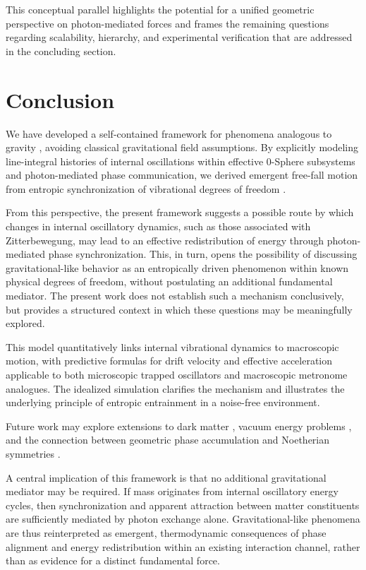 \documentclass[
 reprint,
 amsmath,amssymb,
 aps,
 prb,
]{revtex4-2}
\numberwithin{equation}{section}
\begin{document}
This conceptual parallel highlights the potential for a unified geometric perspective on photon-mediated forces and frames the remaining questions regarding scalability, hierarchy, and experimental verification that are addressed in the concluding section.

\section{Conclusion}
\label{sec:conclusion}

We have developed a self-contained framework for phenomena analogous to gravity \cite{Hanamura2026Trilogy3,Hanamura2025Trilogy1,Hanamura2026Trilogy2}, avoiding classical gravitational field assumptions. By explicitly modeling line-integral histories of internal oscillations within effective 0-Sphere subsystems and photon-mediated phase communication, we derived emergent free-fall motion from entropic synchronization of vibrational degrees of freedom \cite{Pikovsky2001,Strogatz2000,Bennett2002,Jacobson1995,Verlinde2011,Padmanabhan2010}.

From this perspective, the present framework suggests a possible route by which changes in internal oscillatory dynamics, such as those associated with Zitterbewegung, may lead to an effective redistribution of energy through photon-mediated phase synchronization. This, in turn, opens the possibility of discussing gravitational-like behavior as an entropically driven phenomenon within known physical degrees of freedom, without postulating an additional fundamental mediator. The present work does not establish such a mechanism conclusively, but provides a structured context in which these questions may be meaningfully explored.

This model quantitatively links internal vibrational dynamics to macroscopic motion, with predictive formulas for drift velocity and effective acceleration applicable to both microscopic trapped oscillators and macroscopic metronome analogues. The idealized simulation clarifies the mechanism and illustrates the underlying principle of entropic entrainment in a noise-free environment.

Future work may explore extensions to dark matter \cite{Hanamura2025Spin}, vacuum energy problems \cite{Hanamura2026Vacuum}, and the connection between geometric phase accumulation and Noetherian symmetries \cite{Hanamura2025Noetherian}.

A central implication of this framework is that no additional gravitational mediator may be required. If mass originates from internal oscillatory energy cycles, then synchronization and apparent attraction between matter constituents are sufficiently mediated by photon exchange alone. Gravitational-like phenomena are thus reinterpreted as emergent, thermodynamic consequences of phase alignment and energy redistribution within an existing interaction channel, rather than as evidence for a distinct fundamental force.
\end{document}
